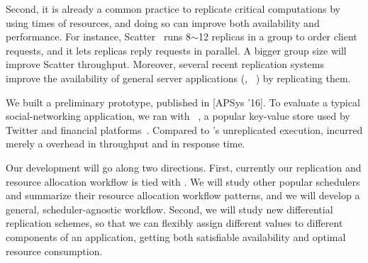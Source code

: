 Second, it is already a common practice to replicate critical computations by 
using  times of resources, and doing so can improve both availability and 
performance. For instance, Scatter~\cite{scatter:sosp11} runs 8$\sim$12 
replicas in a \paxos group to order client requests, and it lets replicas reply 
requests in parallel. A bigger group size will improve Scatter throughput. 
Moreover, several recent replication 
systems~\cite{eve:osdi12,rex:eurosys14,crane:sosp15} 
improve the availability of general server applications (\eg, 
\mysql~\cite{mysql}) by replicating them.




 We built a preliminary \tripod prototype, 
published in [APSys '16]. To evaluate a typical social-networking application, 
we ran \tripod with \memcached~\cite{memcached}, a popular key-value store used 
by Twitter and financial platforms~\cite{nosql:finance}. Compared to 
\memcached's unreplicated execution, \tripod incurred merely a \tputoverhead 
overhead in throughput and \latencyoverhead in response time.


 Our \tripod development will go along two directions. 
First, currently our replication and resource allocation workflow is tied with 
\mesos. We will study other popular schedulers and summarize their 
resource allocation workflow patterns, and we will develop a general, 
scheduler-agnostic workflow. Second, we will study new differential replication 
schemes, so that we can flexibly assign different  values to different 
components of an application, getting both satisfiable availability and optimal 
resource consumption.

